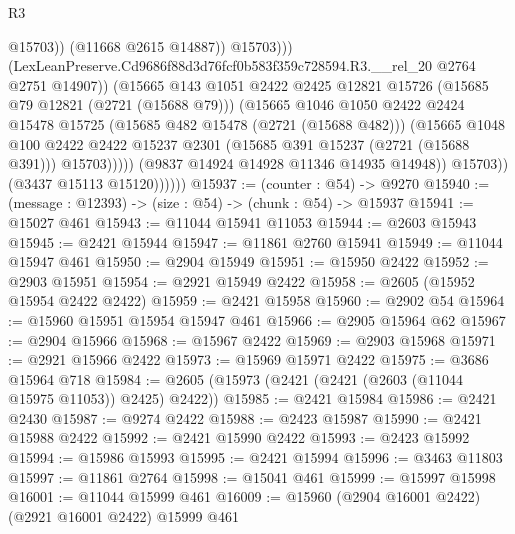\begin{lexlean}{R3}
\begin{coremodule}
                                      @15703))
                                  (@11668 @2615 @14887))
                                @15703)))
                          (LexLeanPreserve.Cd9686f88d3d76fcf0b583f359c728594.R3.__rel_20
                            @2764
                            @2751
                            @14907))
                        (@15665
                          @143
                          @1051
                          @2422
                          @2425
                          @12821
                          @15726
                          (@15685 @79 @12821 (@2721 (@15688 @79)))
                          (@15665
                            @1046
                            @1050
                            @2422
                            @2424
                            @15478
                            @15725
                            (@15685 @482 @15478 (@2721 (@15688 @482)))
                            (@15665
                              @1048
                              @100
                              @2422
                              @2422
                              @15237
                              @2301
                              (@15685 @391 @15237 (@2721 (@15688 @391)))
                              @15703)))))
                    (@9837 @14924 @14928 @11346 @14935 @14948))
                  @15703))
              (@3437 @15113 @15120))))))
@15937 := (counter : @54) -> @9270
@15940 := (message : @12393) -> (size : @54) -> (chunk : @54) -> @15937
@15941 := @15027 @461
@15943 := @11044 @15941 @11053
@15944 := @2603 @15943
@15945 := @2421 @15944
@15947 := @11861 @2760 @15941
@15949 := @11044 @15947 @461
@15950 := @2904 @15949
@15951 := @15950 @2422
@15952 := @2903 @15951
@15954 := @2921 @15949 @2422
@15958 := @2605 (@15952 @15954 @2422 @2422)
@15959 := @2421 @15958
@15960 := @2902 @54
@15964 := @15960 @15951 @15954 @15947 @461
@15966 := @2905 @15964 @62
@15967 := @2904 @15966
@15968 := @15967 @2422
@15969 := @2903 @15968
@15971 := @2921 @15966 @2422
@15973 := @15969 @15971 @2422
@15975 := @3686 @15964 @718
@15984 := @2605 (@15973 (@2421 (@2421 (@2603 (@11044 @15975 @11053)) @2425) @2422))
@15985 := @2421 @15984
@15986 := @2421 @2430
@15987 := @9274 @2422
@15988 := @2423 @15987
@15990 := @2421 @15988 @2422
@15992 := @2421 @15990 @2422
@15993 := @2423 @15992
@15994 := @15986 @15993
@15995 := @2421 @15994
@15996 := @3463 @11803
@15997 := @11861 @2764
@15998 := @15041 @461
@15999 := @15997 @15998
@16001 := @11044 @15999 @461
@16009 := @15960 (@2904 @16001 @2422) (@2921 @16001 @2422) @15999 @461

\end{coremodule}
\end{lexlean}
